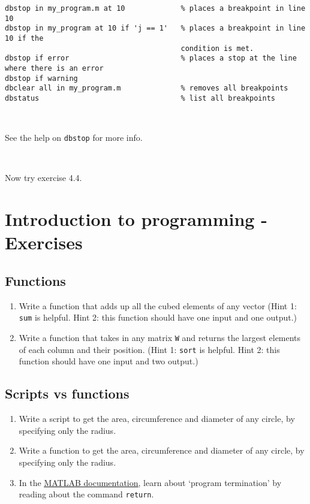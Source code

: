 \documentclass[11pt]{amsart}
\begin{document}
\color{blue}
\begin{verbatim}
dbstop in my_program.m at 10             % places a breakpoint in line 10
dbstop in my_program at 10 if 'j == 1'   % places a breakpoint in line 10 if the 
                                         condition is met.
dbstop if error                          % places a stop at the line where there is an error
dbstop if warning
dbclear all in my_program.m              % removes all breakpoints
dbstatus                                 % list all breakpoints
\end{verbatim}
\color{black}

\

See the help on \verb+dbstop+ for more info.

\


Now try exercise 4.4.

\section{Introduction to programming - Exercises}

\subsection{Functions}
\begin{enumerate}
\item Write a function that adds up all the cubed elements of any vector (Hint 1: \verb+sum+ is helpful. Hint 2: this function should have one input and one output.)
\item Write a function that takes in any matrix \verb+W+ and returns the largest elements of each column and their position. (Hint 1: \verb+sort+ is helpful. Hint 2: this function should have one input and two output.)
\end{enumerate}

\subsection{Scripts vs functions}
\begin{enumerate}
\item Write a script to get the area, circumference and diameter of any circle, by specifying only the radius.
\item Write a function to get the area, circumference and diameter of any circle, by specifying only the radius.
\item  In the \href{http://uk.mathworks.com/help/matlab/learn_matlab/flow-control.html}{\underline{MATLAB documentation}}, learn about `program termination' by reading about the command \verb+return+.
\end{enumerate}
\end{document}
